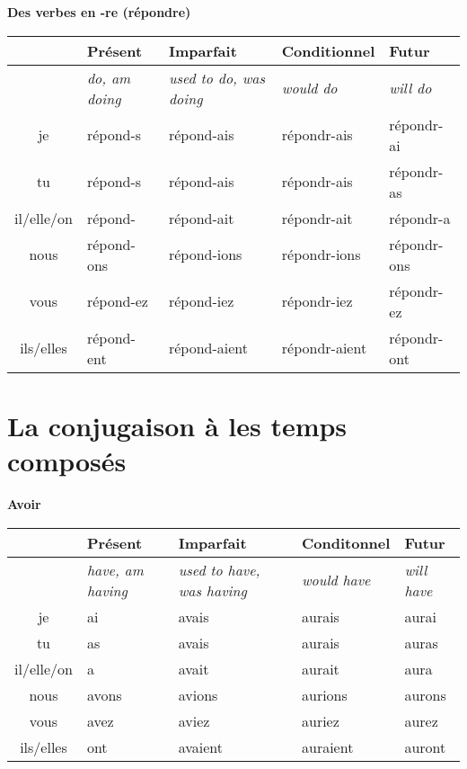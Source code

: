 \vskip 1.5cm
\renewcommand{\stemPresent}{r\'epond}
\renewcommand{\stemFutur}{r\'epondr}
\begin{center}
\textbf{Des verbes en -re (r\'epondre)}
\vskip 0.1cm
\begin{tabular}{|c||L{3cm}|L{3cm}|L{3cm}|L{3cm}|}
\hline
& Pr\'esent & Imparfait & Conditionnel & Futur \\
\hline
& \textit{do, am doing} & \textit{used to do, was doing} & \textit{would do} & \textit{will do} \\
\hline\hline
je           &	\stemPresent-s 	&	\stemPresent-ais	&	\stemFutur-ais	 &	\stemFutur-ai	\\
tu           &	\stemPresent-s	&	\stemPresent-ais	&	\stemFutur-ais	&	\stemFutur-as	\\
il/elle/on &	\stemPresent-	&	\stemPresent-ait	&	\stemFutur-ait	&	\stemFutur-a	\\
nous      &	\stemPresent-ons	&	\stemPresent-ions	&	\stemFutur-ions	&	\stemFutur-ons	\\
vous      &	\stemPresent-ez	&	\stemPresent-iez	&	\stemFutur-iez		&	\stemFutur-ez	\\
ils/elles  &	\stemPresent-ent	&	\stemPresent-aient	&	\stemFutur-aient	&	\stemFutur-ont	\\
\hline
\end{tabular}
\end{center}


\clearpage
\section{La conjugaison \`a les temps compos\'es}
\setcounter{theorem}{0}
\setcounter{equation}{0}

\begin{flushleft}
\textbf{Avoir}
\vskip 0.1cm
\begin{tabular}{|c||L{2.5cm}|L{2.5cm}|L{2.5cm}|L{2.5cm}|}
\hline
& Pr\'esent & Imparfait & Conditonnel & Futur \\
\hline
& \textit{have, am having} & \textit{used to have, was having} & \textit{would have} & \textit{will have} \\
\hline\hline
je            &	ai	&	avais	&	aurais	 &	aurai	\\
tu            &	as 	&	avais	&	aurais	&	auras	\\
il/elle/on  &	a	&	avait	&	aurait	&	aura	\\
nous       &	avons	&	avions	&	aurions	&	aurons	\\
vous       &	avez	&	aviez	&	auriez		&	aurez	\\
ils/elles   &	ont 	&	avaient	&	auraient	&	auront	\\
\hline
\end{tabular}
\end{flushleft}

